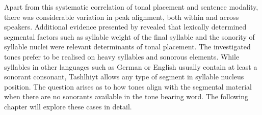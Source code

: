 Apart from this systematic correlation of tonal placement and sentence modality, there was considerable variation in peak alignment, both within and across speakers. Additional evidence presented by \citet{Grice.etal2015tash} revealed that lexically determined segmental factors such as syllable weight of the final syllable and the sonority of syllable nuclei were relevant determinants of tonal placement. The investigated tones prefer to be realised on heavy syllables and sonorous elements. While syllables in other languages such as German or English usually contain at least a sonorant consonant, Tashlhiyt allows any type of segment in syllable nucleus position. The question arises as to how tones align with the segmental material when there are no sonorants available in the tone bearing word. The following chapter will explore these cases in detail.
